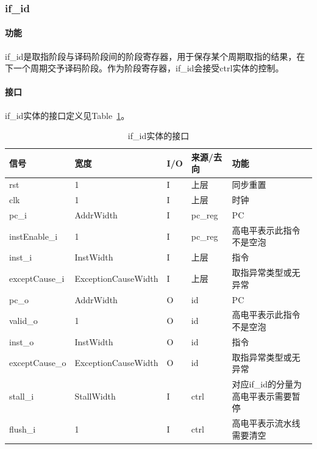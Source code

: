 \documentclass{article}
\begin{document}
\begin{spacing}{1.4}
\subsubsection{if\_id}

\paragraph{功能}\mbox{}

if\_id是取指阶段与译码阶段间的阶段寄存器，用于保存某个周期取指的结果，在下一个周期交予译码阶段。作为阶段寄存器，if\_id会接受ctrl实体的控制。

\paragraph{接口}\mbox{}

if\_id实体的接口定义见Table~\ref{tb:ifid-interface}。
\begin{table}[!htb]
\begin{center}
\begin{tabular*}{15cm}{l|l|l|l|p{5cm}}
\hline
\textbf{信号}&\textbf{宽度}&\textbf{I/O}&\textbf{来源/去向}&\textbf{功能} \\
\hline rst                     & 1                      & I     & 上层          & 同步重置 \\
\hline clk                     & 1                      & I     & 上层          & 时钟 \\
\hline pc\_i                   & AddrWidth              & I     & pc\_reg       & PC \\
\hline instEnable\_i           & 1                      & I     & pc\_reg       & 高电平表示此指令不是空泡 \\
\hline inst\_i                 & InstWidth              & I     & 上层          & 指令 \\
\hline exceptCause\_i          & ExceptionCauseWidth    & I     & 上层          & 取指异常类型或无异常 \\
\hline pc\_o                   & AddrWidth              & O     & id            & PC \\
\hline valid\_o                & 1                      & O     & id            & 高电平表示此指令不是空泡 \\
\hline inst\_o                 & InstWidth              & O     & id            & 指令 \\
\hline exceptCause\_o          & ExceptionCauseWidth    & O     & id            & 取指异常类型或无异常 \\
\hline stall\_i                & StallWidth             & I     & ctrl          & 对应if\_id的分量为高电平表示需要暂停 \\
\hline flush\_i                & 1                      & I     & ctrl          & 高电平表示流水线需要清空 \\
\hline
\end{tabular*}
\caption{if\_id实体的接口}
\label{tb:ifid-interface}
\end{center}
\end{table}


\end{spacing}
\end{document}
